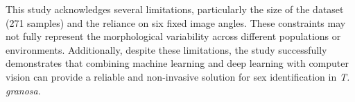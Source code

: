 This study acknowledges several limitations, particularly the size of the dataset (271 samples) and the reliance on six fixed image angles. These constraints may not fully represent the morphological variability across different populations or environments. Additionally, despite these limitations, the study successfully demonstrates that combining machine learning and deep learning with computer vision can provide a reliable and non-invasive solution for sex identification in \textit{T. granosa}.